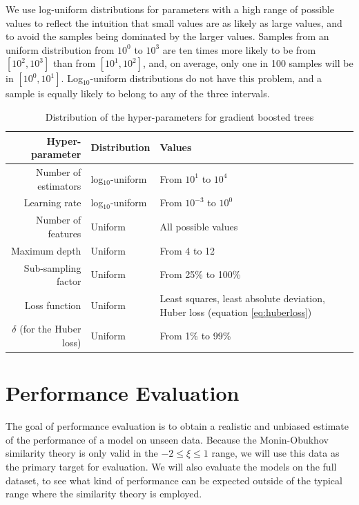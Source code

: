\documentclass[a4paper]{book}
\begin{document}
We use log-uniform distributions for parameters with a high range of possible values to reflect the intuition that small values are as likely as large values, and to avoid the samples being dominated by the larger values. Samples from an uniform distribution from $10^0$ to $10^3$ are ten times more likely to be from $[10^2,10^3]$ than from $[10^1,10^2]$, and, on average, only one in 100 samples will be in $[10^0,10^1]$. Log$_{10}$-uniform distributions do not have this problem, and a sample is equally likely to belong to any of the three intervals.

\begin{table}[]
\centering
\caption{Distribution of the hyper-parameters for gradient boosted trees}
\label{tbl:gb_hyperparams}
\begin{tabularx}{\textwidth}{r|l|X}
\toprule
\textbf{Hyper-parameter} & \textbf{Distribution} & \textbf{Values} \\ \midrule
Number of estimators & log$_{10}$-uniform & From $10^1$ to $10^4$ \\
Learning rate & log$_{10}$-uniform & From $10^{-3}$ to $10^0$ \\
Number of features & Uniform & All possible values \\
Maximum depth & Uniform & From 4 to 12 \\
Sub-sampling factor & Uniform & From 25\% to 100\% \\
Loss function & Uniform & Least squares, least absolute deviation, \newline Huber loss (equation \ref{eq:huberloss}) \\
$\delta$ (for the Huber loss) & Uniform & From 1\% to 99\% \\
\bottomrule
\end{tabularx}
\end{table}



\section{Performance Evaluation}
\label{sec:perf_eval}
The goal of performance evaluation is to obtain a realistic and unbiased estimate of the performance of a model on unseen data. Because the Monin-Obukhov similarity theory is only valid in the $-2\leq\xi\leq1$ range, we will use this data as the primary target for evaluation. We will also evaluate the models on the full dataset, to see what kind of performance can be expected outside of the typical range where the similarity theory is employed.
\end{document}
